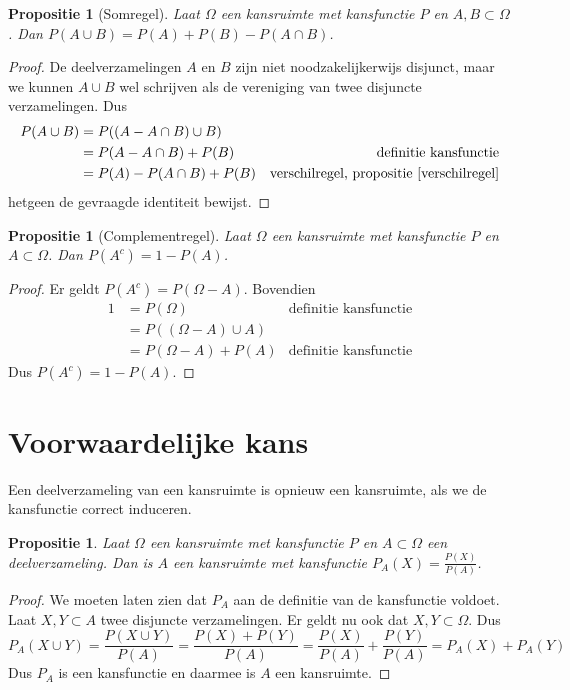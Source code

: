 \documentclass[a4paper]{report}
\newtheorem{proposition}[theorem]{Propositie}
\theoremstyle{definition}
\begin{document}
\begin{proposition}[Somregel]
	\label{somregel}
	Laat $\Omega$ een kansruimte met kansfunctie $P$ en $A,B \subset \Omega$.
	Dan $P(A \cup B) = P(A) + P(B) - P(A \cap B)$.
\end{proposition}
\begin{proof}
	De deelverzamelingen $A$ en $B$ zijn niet noodzakelijkerwijs disjunct, maar we kunnen $A \cup B$ wel schrijven als de vereniging van twee disjuncte verzamelingen.
	Dus 
	\begin{align*}
		P(A \cup B) 	&= P( (A - A \cap B) \cup B) \\
		&= P(A - A \cap B) + P(B)  & \text{definitie kansfunctie}\\
		&= P(A) - P(A \cap B) + P(B) & \text{verschilregel, propositie \ref{verschilregel}}
	\end{align*}
	hetgeen de gevraagde identiteit bewijst.
\end{proof}

\begin{proposition}[Complementregel]
    \label{complementregel}
	Laat $\Omega$ een kansruimte met kansfunctie $P$ en $A \subset \Omega$.
    Dan $P(A^c) = 1 - P(A)$.
\end{proposition}
\begin{proof}
    Er geldt $P(A^c) = P(\Omega - A)$.
    Bovendien
    \begin{align*}
        1 &= P(\Omega) & \text{definitie kansfunctie}\\
        &= P( (\Omega - A) \cup A) \\
        &= P(\Omega - A) + P(A) & \text{definitie kansfunctie}
    \end{align*}
    Dus $P(A^c) = 1 - P(A)$.
\end{proof}


\section{Voorwaardelijke kans}

Een deelverzameling van een kansruimte is opnieuw een kansruimte, als we de kansfunctie correct induceren.
\begin{proposition}
	Laat $\Omega$ een kansruimte met kansfunctie $P$ en $A \subset \Omega$ een deelverzameling.
	Dan is $A$ een kansruimte met kansfunctie $P_A(X) = \frac{P(X)}{P(A)}$.
\end{proposition}
\begin{proof}
	We moeten laten zien dat $P_A$ aan de definitie van de kansfunctie voldoet.
	Laat $X,Y \subset A$ twee disjuncte verzamelingen.
	Er geldt nu ook dat $X,Y \subset \Omega$. 
	Dus \[ P_A(X \cup Y) = \frac{P(X \cup Y)}{P(A)} = \frac{P(X) + P(Y)}{P(A)} = \frac{P(X)}{P(A)} + \frac{P(Y)}{P(A)} = P_A(X) + P_A(Y) \]
	Dus $P_A$ is een kansfunctie en daarmee is $A$ een kansruimte.
\end{proof}
\end{document}

